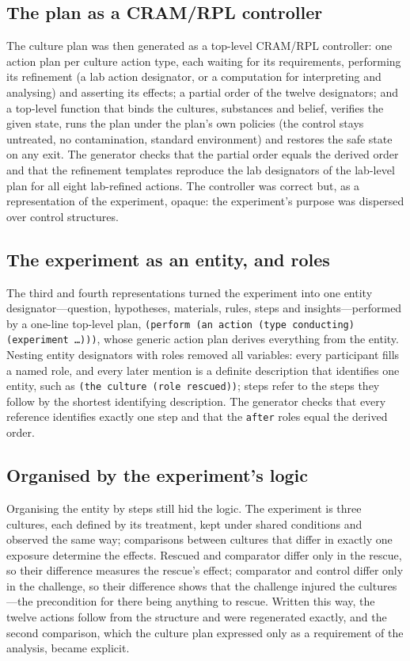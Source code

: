 \documentclass[10pt,a4paper]{article}
\begin{document}
\subsection{The plan as a CRAM/RPL controller}
The culture plan was then generated as a top-level CRAM/RPL controller: one action plan per culture action type, each
waiting for its requirements, performing its refinement (a lab action designator, or a computation for interpreting
and analysing) and asserting its effects; a partial order of the twelve designators; and a top-level function that
binds the cultures, substances and belief, verifies the given state, runs the plan under the plan's own policies (the
control stays untreated, no contamination, standard environment) and restores the safe state on any exit. The
generator checks that the partial order equals the derived order and that the refinement templates reproduce the lab
designators of the lab-level plan for all eight lab-refined actions. The controller was correct but, as a
representation of the experiment, opaque: the experiment's purpose was dispersed over control structures.


\subsection{The experiment as an entity, and roles}
The third and fourth representations turned the experiment into one entity designator---question, hypotheses,
materials, rules, steps and insights---performed by a one-line top-level plan, \texttt{(perform (an action (type
conducting) (experiment \ldots)))}, whose generic action plan derives everything from the entity. Nesting entity
designators with roles removed all variables: every participant fills a named role, and every later mention is a
definite description that identifies one entity, such as \texttt{(the culture (role rescued))}; steps refer to the
steps they follow by the shortest identifying description. The generator checks that every reference identifies
exactly one step and that the \texttt{after} roles equal the derived order.


\subsection{Organised by the experiment's logic}
Organising the entity by steps still hid the logic. The experiment is three cultures, each defined by its treatment,
kept under shared conditions and observed the same way; comparisons between cultures that differ in exactly one
exposure determine the effects. Rescued and comparator differ only in the rescue, so their difference measures the
rescue's effect; comparator and control differ only in the challenge, so their difference shows that the challenge
injured the cultures---the precondition for there being anything to rescue. Written this way, the twelve actions
follow from the structure and were regenerated exactly, and the second comparison, which the culture plan expressed
only as a requirement of the analysis, became explicit.
\end{document}
